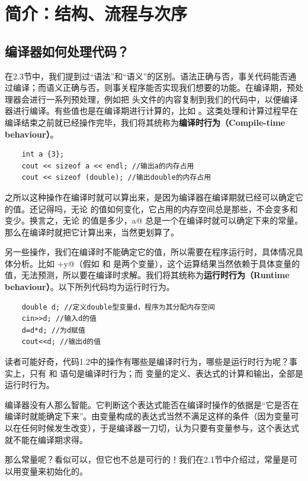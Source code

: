 \section{简介：结构、流程与次序}
\subsection*{编译器如何处理代码？}
在2.3节中，我们提到过``语法''和``语义''的区别。语法正确与否，事关代码能否通过编译；而语义正确与否，则事关程序能否实现我们想要的功能。在编译期，预处理器会进行一系列预处理，例如把 \lstinline@iostream@ 头文件的内容复制到我们的代码中，以便编译器进行编译。有些值也是在编译期进行计算的，比如 \lstinline@sizeof@。这类处理和计算过程早在编译结束之前就已经操作完毕，我们将其统称为\textbf{编译时行为（Compile-time behaviour）}。\par
\begin{lstlisting}
    int a {3};
    cout << sizeof a << endl; //输出a的内存占用
    cout << sizeof (double); //输出double的内存占用
\end{lstlisting}
之所以这种操作在编译时就可以算出来，是因为编译器在编译期就已经可以确定它的值。还记得吗，无论 \lstinline@a@ 的值如何变化，它占用的内存空间总是那些，不会变多和变少。换言之，无论 \lstinline@a@ 的值是多少，\lstinline@sizeof a@ 总是一个在编译时就可以确定下来的常量。那么在编译时就把它计算出来，当然更划算了。\par
另一些操作，我们在编译时不能确定它的值，所以需要在程序运行时，具体情况具体分析。比如 \lstinline@x+y@（假如 \lstinline@x@ 和 \lstinline@y@ 是两个变量），这个运算结果当然依赖于具体变量的值，无法预测，所以要在编译时求解。我们将其统称为\textbf{运行时行为（Runtime behaviour）}。以下所列代码均为运行时行为。
\begin{lstlisting}
    double d; //定义double型变量d，程序为其分配内存空间
    cin>>d; //输入d的值
    d=d*d; //为d赋值
    cout<<d; //输出d的值
\end{lstlisting}\par
读者可能好奇，代码1.2中的操作有哪些是编译时行为，哪些是运行时行为呢？事实上，只有 \lstinline@include@ 和 \lstinline@using@ 语句是编译时行为；而 \lstinline@double@ 变量的定义、表达式的计算和输出，全部是运行时行为。\par
编译器没有人那么智能。它判断这个表达式能否在编译时操作的依据是``它是否在编译时就能确定下来''。由变量构成的表达式当然不满足这样的条件（因为变量可以在任何时候发生改变），于是编译器一刀切，认为只要有变量参与，这个表达式就不能在编译期求得。\par
那么常量呢？看似可以，但它也不总是可行的！我们在2.1节中介绍过，常量是可以用变量来初始化的。
